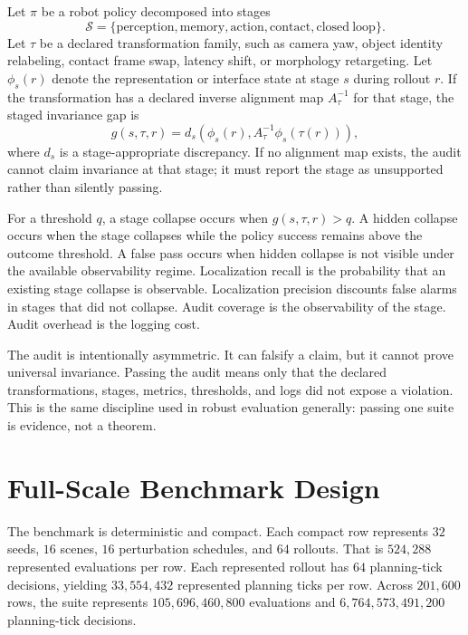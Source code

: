 \documentclass{article}
\newcommand{\auditgap}{g}
\newcommand{\policy}{\pi}
\newcommand{\stage}{s}
\newcommand{\transform}{\tau}
\begin{document}
Let $\policy$ be a robot policy decomposed into stages
\[
    \mathcal{S} = \{\mathrm{perception}, \mathrm{memory}, \mathrm{action}, \mathrm{contact}, \mathrm{closed\ loop}\}.
\]
Let $\transform$ be a declared transformation family, such as camera yaw, object identity relabeling, contact frame swap, latency shift, or morphology retargeting. Let $\phi_{\stage}(r)$ denote the representation or interface state at stage $\stage$ during rollout $r$. If the transformation has a declared inverse alignment map $A_{\transform}^{-1}$ for that stage, the staged invariance gap is
\[
    \auditgap(\stage,\transform,r) =
    d_{\stage}\left(\phi_{\stage}(r), A_{\transform}^{-1}\phi_{\stage}(\transform(r))\right),
\]
where $d_{\stage}$ is a stage-appropriate discrepancy. If no alignment map exists, the audit cannot claim invariance at that stage; it must report the stage as unsupported rather than silently passing.

For a threshold $q$, a stage collapse occurs when $\auditgap(\stage,\transform,r) > q$. A hidden collapse occurs when the stage collapses while the policy success remains above the outcome threshold. A false pass occurs when hidden collapse is not visible under the available observability regime. Localization recall is the probability that an existing stage collapse is observable. Localization precision discounts false alarms in stages that did not collapse. Audit coverage is the observability of the stage. Audit overhead is the logging cost.

The audit is intentionally asymmetric. It can falsify a claim, but it cannot prove universal invariance. Passing the audit means only that the declared transformations, stages, metrics, thresholds, and logs did not expose a violation. This is the same discipline used in robust evaluation generally: passing one suite is evidence, not a theorem.

\section{Full-Scale Benchmark Design}

The benchmark is deterministic and compact. Each compact row represents $32$ seeds, $16$ scenes, $16$ perturbation schedules, and $64$ rollouts. That is $524{,}288$ represented evaluations per row. Each represented rollout has $64$ planning-tick decisions, yielding $33{,}554{,}432$ represented planning ticks per row. Across $201{,}600$ rows, the suite represents $105{,}696{,}460{,}800$ evaluations and $6{,}764{,}573{,}491{,}200$ planning-tick decisions.
\end{document}
